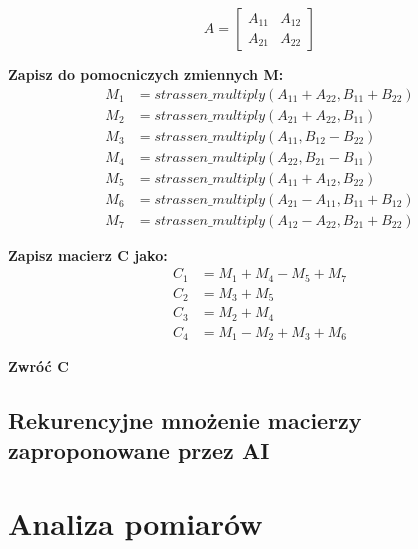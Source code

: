 \documentclass{article}
\begin{document}
        \[
        A = 
        \begin{bmatrix}
            A_{11} & A_{12} \\
            A_{21} & A_{22}
        \end{bmatrix}
        \]
        
        \textbf{Zapisz do pomocniczych zmiennych M:}
        \begin{align*}
        M_1 &= strassen\_multiply(A_{11} + A_{22}, B_{11} + B_{22}) \\
        M_2 &= strassen\_multiply(A_{21} + A_{22}, B_{11}) \\
        M_3 &= strassen\_multiply(A_{11}, B_{12} - B_{22}) \\
        M_4 &= strassen\_multiply(A_{22}, B_{21} - B_{11}) \\
        M_5 &= strassen\_multiply(A_{11} + A_{12}, B_{22}) \\
        M_6 &= strassen\_multiply(A_{21} - A_{11}, B_{11} + B_{12}) \\
        M_7 &= strassen\_multiply(A_{12} - A_{22}, B_{21} + B_{22})
        \end{align*}
        
        \textbf{Zapisz macierz C jako:}
        \begin{align*}
        C_1 &= M_1 + M_4 - M_5 + M_7 \\
        C_2 &= M_3 + M_5 \\
        C_3 &= M_2 + M_4 \\
        C_4 &= M_1 - M_2 + M_3 + M_6
        \end{align*}
        
        \textbf{Zwróć C}
    
    \subsection{Rekurencyjne mnożenie macierzy zaproponowane przez AI}
\section{Analiza pomiarów}
\end{document}
